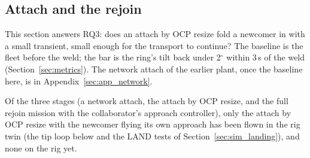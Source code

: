 
\subsection{Attach and the rejoin}
\label{sec:sim_attach}

This section answers RQ3: does an attach by OCP resize fold a newcomer in with a small transient, small
enough for the transport to continue? The baseline is the fleet before the weld; the bar is the
ring's tilt back under 2$^\circ$ within 3\,s of the weld (Section~\ref{sec:metrics}). The network attach of the
earlier plant, once the baseline here, is in Appendix~\ref{sec:app_network}.

Of the three stages (a network attach, the attach by OCP resize, and the full rejoin mission with the
collaborator's approach controller), only the attach by OCP resize with the newcomer flying its own approach
has been flown in the rig twin (the tip loop below and the LAND tests of Section~\ref{sec:sim_landing}), and
none on the rig yet.



